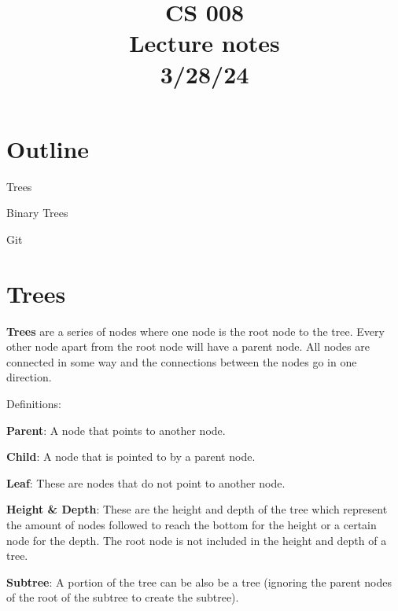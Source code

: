 \documentclass[11pt,a4paper,english]{paper}
\begin{document}
\title{CS 008 \\ Lecture notes \\ 3/28/24}
\maketitle

\section{Outline}

\begin{itemize} {

    \item Trees
    \item Binary Trees
    \item Git

}\end{itemize}

\section{Trees}

\textbf{Trees} are a series of nodes where one node is the root node to the tree. Every other node apart from the root node will have a parent node. All nodes are connected in some way and the connections between the nodes go in one direction.

\bigskip
\begin{bluebox}{Definitions:}{

  \begin{itemize} {

      \item \textbf{Parent}: A node that points to another node.
      \item \textbf{Child}: A node that is pointed to by a parent node.
      \item \textbf{Leaf}: These are nodes that do not point to another node.
      \item \textbf{Height \& Depth}: These are the height and depth of the tree which represent the amount of nodes followed to reach the bottom for the height or a certain node for the depth. The root node is not included in the height and depth of a tree.
      \item \textbf{Subtree}: A portion of the tree can be also be a tree (ignoring the parent nodes of the root of the subtree to create the subtree).

  }\end{itemize}

}\end{bluebox}
\end{document}
